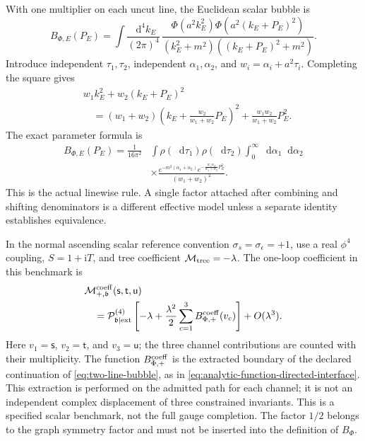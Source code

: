 \documentclass[final,5p,times,twocolumn,numbers,nopreprintline]{elsarticle}
\numberwithin{equation}{section}
\theoremstyle{definition}
\theoremstyle{remark}
\newcommand{\dd}{\mathop{}\!\mathrm d}
\newcommand{\ii}{\mathrm i}
\newcommand{\bb}{\mathfrak b}
\newcommand{\Ph}{\Phi}
\newcommand{\sMand}{\mathsf{s}}
\newcommand{\tMand}{\mathsf{t}}
\newcommand{\uMand}{\mathsf{u}}
\begin{document}
With one multiplier on each uncut line, the Euclidean scalar bubble is
\begin{equation}
 B_{\Ph,E}(P_E)=
 \int\frac{\dd^4k_E}{(2\pi)^4}\,
 \frac{\Ph(a^2k_E^2)\Ph(a^2(k_E+P_E)^2)}
      {(k_E^2+m^2)((k_E+P_E)^2+m^2)} .
 \label{eq:two-line-bubble}
\end{equation}
Introduce independent \(\tau_1,\tau_2\), independent
\(\alpha_1,\alpha_2\), and \(w_i=\alpha_i+a^2\tau_i\).
Completing the square gives
\[
\begin{aligned}
 &w_1k_E^2+w_2(k_E+P_E)^2\\
 &\quad=(w_1+w_2)\left(k_E+\frac{w_2}{w_1+w_2}P_E\right)^2
       +\frac{w_1w_2}{w_1+w_2}P_E^2.
\end{aligned}
\]
The exact parameter formula is
\begin{align}
 B_{\Ph,E}(P_E)
 =\frac1{16\pi^2}
 &\int\rho(\dd\tau_1)\rho(\dd\tau_2)
       \int_0^\infty\dd\alpha_1\dd\alpha_2 \nonumber\\
 &\times\frac{
 e^{-m^2(\alpha_1+\alpha_2)}
 e^{-\frac{w_1w_2}{w_1+w_2}P_E^2}
 }{(w_1+w_2)^2}.
 \label{eq:two-line-parameters}
\end{align}
This is the actual linewise rule. A single factor attached after
combining and shifting denominators is a different effective
model unless a separate identity establishes equivalence.

In the normal ascending scalar reference convention
\(\sigma_s=\sigma_\epsilon=+1\), use a real \(\phi^4\)
coupling, \(S=1+\ii T\), and tree coefficient
\(\mathcal M_{\rm tree}=-\lambda\). The one-loop
coefficient in this benchmark is
\begin{equation}
\begin{aligned}
 &\mathcal M^{\rm coeff}_{+,\bb}(\sMand,\tMand,\uMand)\\
 &\quad=\mathcal P^{(4)}_{\bb\mid{\rm ext}}
 \left[-\lambda+\frac{\lambda^2}{2}
    \sum_{c=1}^{3}B^{\rm coeff}_{\Ph,+}(v_c)\right]+O(\lambda^3).
\end{aligned}
 \label{eq:scalar-amplitude}
\end{equation}
Here \(v_1=\sMand\), \(v_2=\tMand\), and \(v_3=\uMand\);
the three channel contributions are counted with their multiplicity.
The function \(B^{\rm coeff}_{\Ph,+}\) is the extracted boundary
of the declared continuation of \eqref{eq:two-line-bubble}, as in
\eqref{eq:analytic-function-directed-interface}. This extraction is
performed on the admitted path for each channel; it is not an
independent complex displacement of three constrained invariants. This is a specified scalar benchmark,
not the full gauge completion. The factor \(1/2\) belongs to
the graph symmetry factor and must not be inserted into the
definition of \(B_\Ph\).
\end{document}
